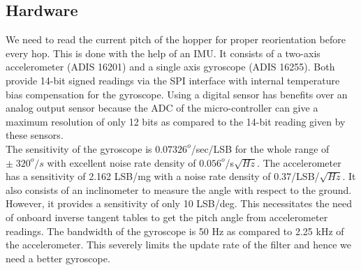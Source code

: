 \subsection{Hardware}
We need to read the current pitch of the hopper for proper reorientation before every hop. This is done with the help of an IMU.
It consists of a two-axis accelerometer (ADIS 16201) and a single axis gyroscope (ADIS 16255). Both provide 14-bit signed readings
via the SPI interface with internal temperature bias compensation for the gyroscope. Using a digital sensor has benefits over
an analog output sensor because the ADC of the micro-controller can give a maximum resolution of only 12 bits as compared to the
14-bit reading given by these sensors.\\

The sensitivity of the gyroscope is $0.07326^o$/sec/LSB for the whole range of $\pm\;320^o/s$ with excellent noise rate density of
$0.056^o$/s$\sqrt{Hz}$. The accelerometer has a sensitivity of 2.162 LSB/mg with a noise rate density of 0.37/LSB/$\sqrt{Hz}$. It also consists of an
inclinometer to measure the angle with respect to the ground. However, it provides a sensitivity of only 10 LSB/deg. This
necessitates the need of onboard inverse tangent tables to get the pitch angle from accelerometer readings. The bandwidth of the
gyroscope is 50 Hz as compared to 2.25 kHz of the accelerometer. This severely limits the update rate of the filter and hence we
need a better gyroscope.

